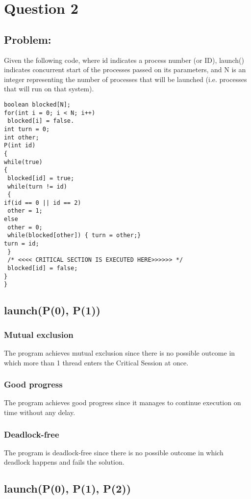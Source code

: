 \newpage
\section{Question 2}

\subsection{Problem:}
Given the following code, where id indicates a process number (or ID), launch() indicates concurrent start
of the processes passed on its parameters, and N is an integer representing the number of processes that
will be launched (i.e. processes that will run on that system).

\begin{lstlisting}
boolean blocked[N];
for(int i = 0; i < N; i++)
 blocked[i] = false.
int turn = 0;
int other;
P(int id)
{
while(true)
{
 blocked[id] = true;
 while(turn != id)
 {
if(id == 0 || id == 2)
 other = 1;
else
 other = 0;
 while(blocked[other]) { turn = other;}
turn = id;
 }
 /* <<<< CRITICAL SECTION IS EXECUTED HERE>>>>>> */
 blocked[id] = false;
}
}
\end{lstlisting}

\subsection{launch(P(0), P(1))}
\subsubsection{Mutual exclusion}
The program achieves mutual exclusion since there is no possible outcome in which more than 1 thread enters the Critical Session at once. 

\subsubsection{Good progress}
The program achieves good progress since it manages to continue execution on time without any delay.

\subsubsection{Deadlock-free}
The program is deadlock-free since there is no possible outcome in which deadlock happens and fails the solution.

\newpage
\subsection{launch(P(0), P(1), P(2))}
